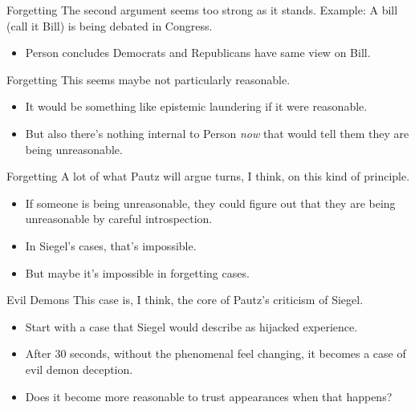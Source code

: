 \documentclass[
  17pt,
  letterpaper,
  ignorenonframetext,
  aspectratio=169,
  xcolor={dvipsnames}]{beamer}
\providecommand{\tightlist}{%
  \setlength{\itemsep}{0pt}\setlength{\parskip}{0pt}}\usepackage{longtable,booktabs,array}
\begin{document}
\begin{frame}{Forgetting}
\protect\hypertarget{forgetting-1}{}
The second argument seems too strong as it stands. Example: A bill (call
it Bill) is being debated in Congress.

\begin{itemize}[<+->]
\tightlist
\item
  Person concludes Democrats and Republicans have same view on Bill.
\end{itemize}
\end{frame}

\begin{frame}{Forgetting}
\protect\hypertarget{forgetting-2}{}
This seems maybe not particularly reasonable.

\begin{itemize}[<+->]
\tightlist
\item
  It would be something like epistemic laundering if it were reasonable.
\item
  But also there's nothing internal to Person \emph{now} that would tell
  them they are being unreasonable.
\end{itemize}
\end{frame}

\begin{frame}{Forgetting}
\protect\hypertarget{forgetting-3}{}
A lot of what Pautz will argue turns, I think, on this kind of
principle.

\begin{itemize}[<+->]
\tightlist
\item
  If someone is being unreasonable, they could figure out that they are
  being unreasonable by careful introspection.
\item
  In Siegel's cases, that's impossible.
\item
  But maybe it's impossible in forgetting cases.
\end{itemize}
\end{frame}

\begin{frame}{Evil Demons}
\protect\hypertarget{evil-demons}{}
This case is, I think, the core of Pautz's criticism of Siegel.

\begin{itemize}[<+->]
\tightlist
\item
  Start with a case that Siegel would describe as hijacked experience.
\item
  After 30 seconds, without the phenomenal feel changing, it becomes a
  case of evil demon deception.
\item
  Does it become more reasonable to trust appearances when that happens?
\end{itemize}
\end{frame}
\end{document}
